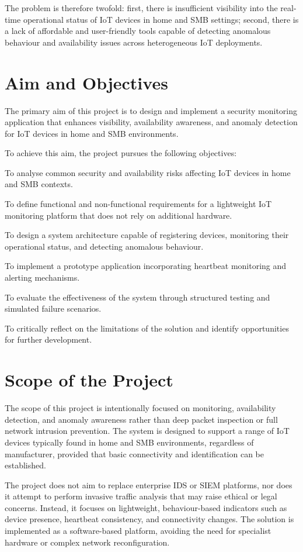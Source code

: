 The problem is therefore twofold: first, there is insufficient visibility into the real-time operational status of IoT devices in home and SMB settings; second, there is a lack of affordable and user-friendly tools capable of detecting anomalous behaviour and availability issues across heterogeneous IoT deployments.

\section{Aim and Objectives}

The primary aim of this project is to design and implement a security monitoring application that enhances visibility, availability awareness, and anomaly detection for IoT devices in home and SMB environments.

To achieve this aim, the project pursues the following objectives:

To analyse common security and availability risks affecting IoT devices in home and SMB contexts.

To define functional and non-functional requirements for a lightweight IoT monitoring platform that does not rely on additional hardware.

To design a system architecture capable of registering devices, monitoring their operational status, and detecting anomalous behaviour.

To implement a prototype application incorporating heartbeat monitoring and alerting mechanisms.

To evaluate the effectiveness of the system through structured testing and simulated failure scenarios.

To critically reflect on the limitations of the solution and identify opportunities for further development.

\section{Scope of the Project}

The scope of this project is intentionally focused on monitoring, availability detection, and anomaly awareness rather than deep packet inspection or full network intrusion prevention. The system is designed to support a range of IoT devices typically found in home and SMB environments, regardless of manufacturer, provided that basic connectivity and identification can be established.

The project does not aim to replace enterprise IDS or SIEM platforms, nor does it attempt to perform invasive traffic analysis that may raise ethical or legal concerns. Instead, it focuses on lightweight, behaviour-based indicators such as device presence, heartbeat consistency, and connectivity changes. The solution is implemented as a software-based platform, avoiding the need for specialist hardware or complex network reconfiguration.

